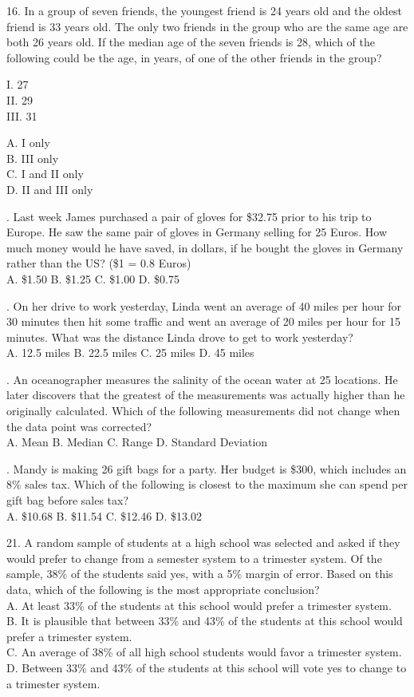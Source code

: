 \documentclass[../satmath.tex]{subfiles}
\begin{document}
\begin{enumerate}[label=\bfseries\arabic*.]
16. In a group of seven friends, the youngest friend is 24 years old and the oldest friend is 33 years old. The only two friends in the group who are the 
same age are both 26 years old. If the median age of the seven friends is 28, which of the following could be the age, in years, of one of the other friends 
in the group?

I. 27\\
II. 29\\
III. 31

A. I only\\
B. III only\\
C. I and II only\\
D. II and III only

. Last week James purchased a pair of gloves for \$32.75 prior to his trip to Europe. He saw the same pair of gloves in Germany selling for 25 Euros.
How much money would he have saved, in dollars, if he bought the gloves in Germany rather than the US? (\$1 = 0.8 Euros)\\
A. \$1.50 \quad B. \$1.25 \quad C. \$1.00 \quad D. \$0.75

. On her drive to work yesterday, Linda went an average of 40 miles per hour for 30 minutes then hit some traffic and went an average 
of 20 miles per hour for 15 minutes. What was the distance Linda drove to get to work yesterday?\\
A. 12.5 miles \quad B. 22.5 miles \quad C. 25 miles \quad D. 45 miles 

. An oceanographer measures the salinity of the ocean water at 25 locations. He later discovers that the greatest of the measurements was 
actually higher than he originally calculated. Which of the following measurements did not change when the data point was corrected?\\
A. Mean \quad B. Median \quad C. Range \quad D. Standard Deviation 

. Mandy is making 26 gift bags for a party. Her budget is \$300, which includes an 8\% sales tax. Which of the following is closest to the 
maximum she can spend per gift bag before sales tax?\\
A. \$10.68 \quad B. \$11.54 \quad C. \$12.46 \quad D. \$13.02
\medbreak 

21. A random sample of students at a high school was selected and asked if they would prefer to change from a semester system to a trimester 
system. Of the sample, 38\% of the students said yes, with a 5\% margin of error. Based on this data, which of the following is the most appropriate conclusion?\\
A. At least 33\% of the students at this school would prefer a trimester system.\\
B. It is plausible that between 33\% and 43\% of the students at this school would prefer a trimester system.\\
C. An average of 38\% of all high school students would favor a trimester system.\\
D. Between 33\% and 43\% of the students at this school will vote yes to change to a trimester system.


\end{enumerate}
\end{document}
